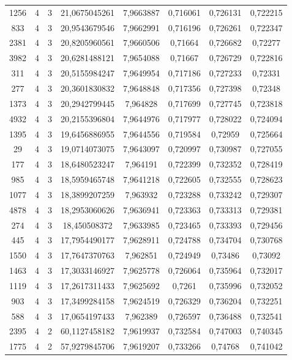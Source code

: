 \begin{longtable}{|c|c|c|c|c|c|c|c|}
1256 & 4 & 3 & 21,0675045261 & 7,9663887 & 0,716061 & 0,726131 & 0,722215 \\
833 & 4 & 3 & 20,9543679546 & 7,9662991 & 0,716196 & 0,726261 & 0,722347 \\
2381 & 4 & 3 & 20,8205960561 & 7,9660506 & 0,71664 & 0,726682 & 0,72277 \\
3982 & 4 & 3 & 20,6281488121 & 7,9654088 & 0,71667 & 0,726729 & 0,722816 \\
311 & 4 & 3 & 20,5155984247 & 7,9649954 & 0,717186 & 0,727233 & 0,72331 \\
277 & 4 & 3 & 20,3601830832 & 7,9648848 & 0,717356 & 0,727398 & 0,72348 \\
1373 & 4 & 3 & 20,2942799445 & 7,964828 & 0,717699 & 0,727745 & 0,723818 \\
4932 & 4 & 3 & 20,2155396804 & 7,9644976 & 0,717977 & 0,728022 & 0,724094 \\
1395 & 4 & 3 & 19,6456886955 & 7,9644556 & 0,719584 & 0,72959 & 0,725664 \\
29 & 4 & 3 & 19,0714073075 & 7,9643097 & 0,720997 & 0,730987 & 0,727055 \\
177 & 4 & 3 & 18,6480523247 & 7,964191 & 0,722399 & 0,732352 & 0,728419 \\
985 & 4 & 3 & 18,5959465748 & 7,9641218 & 0,722605 & 0,732555 & 0,728623 \\
1077 & 4 & 3 & 18,3899207259 & 7,963932 & 0,723288 & 0,733242 & 0,729307 \\
4878 & 4 & 3 & 18,2953060626 & 7,9636941 & 0,723363 & 0,733313 & 0,729381 \\
274 & 4 & 3 & 18,450508372 & 7,9633985 & 0,723465 & 0,733393 & 0,729456 \\
445 & 4 & 3 & 17,7954490177 & 7,9628911 & 0,724788 & 0,734704 & 0,730768 \\
1550 & 4 & 3 & 17,7647370763 & 7,962851 & 0,724949 & 0,73486 & 0,73092 \\
1463 & 4 & 3 & 17,3033146927 & 7,9625778 & 0,726064 & 0,735964 & 0,732017 \\
1119 & 4 & 3 & 17,2617311433 & 7,9625692 & 0,7261 & 0,735996 & 0,732052 \\
903 & 4 & 3 & 17,3499284158 & 7,9624519 & 0,726329 & 0,736204 & 0,732251 \\
588 & 4 & 3 & 17,0654197433 & 7,962389 & 0,726597 & 0,736488 & 0,732541 \\
2395 & 4 & 2 & 60,1127458182 & 7,9619937 & 0,732584 & 0,747003 & 0,740345 \\
1775 & 4 & 2 & 57,9279845706 & 7,9619207 & 0,733266 & 0,74768 & 0,741042 \\

\end{longtable}
